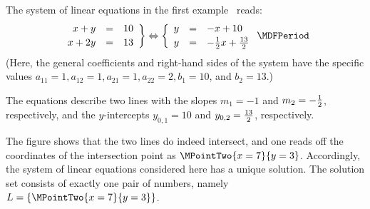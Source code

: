 \begin{MIntro}
\begin{MExample}
The system of linear equations in the first example~ reads:
$$\left. \begin{array}{rcl} x + y & = & 10 \\[.5ex] x + 2 y & = & 13 \end{array} \right\} \Leftrightarrow
\left\{ \begin{array}{rcl} y & = & - x + 10 \\[.5ex] y & = & - \Mtfrac12 x + \Mtfrac{13}{2} \end{array} \right. \MDFPeriod$$
(Here, the general coefficients and right-hand sides of the system 
have the specific values $a_{11} = 1, a_{12} = 1, a_{21} = 1, a_{22} = 2, b_1 = 10$, and $b_2 = 13$.)

The equations describe two lines with the slopes $m_{1} = - 1$ and $m_{2} = - \tfrac{1}{2}$, respectively,
and the $y$-intercepts $y_{0,1} = 10$ and $y_{0,2} = \tfrac{13}{2}$, respectively.

\begin{center}
%
\end{center}
The figure shows that the two lines do indeed intersect, and one reads off the coordinates 
of the intersection point as $\MPointTwo{x = 7}{y = 3}$. Accordingly, the system of 
linear equations considered here has a unique solution. The solution set consists 
of exactly one pair of numbers, namely ${\ML} = \{ \MPointTwo{x = 7}{y = 3} \}$.
\end{MExample}


\end{MIntro}
